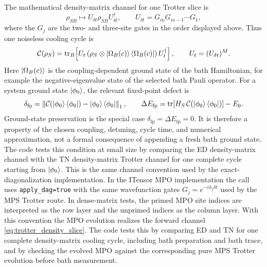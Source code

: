 \documentclass[aps,pra,twocolumn,superscriptaddress,nolongbibliography,nobalancelastpage,10pt]{revtex4-2}
\begin{document}
The mathematical density-matrix channel for one Trotter slice is
\begin{equation}
	\rho_{SB}\longmapsto U_{\delta t}\rho_{SB}U_{\delta t}^\dagger,
	\qquad
	U_{\delta t}=G_mG_{m-1}\cdots G_1,
	\label{eq:trotter_density_slice}
\end{equation}
where the $G_j$ are the two- and three-site gates in the order displayed
above.  Thus one noiseless cooling cycle is
\begin{equation}
	\mathcal C(\rho_S)=
	\operatorname{tr}_B\!\left[
	U_t\left(\rho_S\otimes\ket{\Omega_B(c)}\bra{\Omega_B(c)}\right)U_t^\dagger
	\right],
	\qquad U_t=(U_{\delta t})^M .
	\label{eq:tn_density_cycle}
\end{equation}
Here \(\ket{\Omega_B(c)}\) is the coupling-dependent ground state of the bath
Hamiltonian, for example the negative-eigenvalue state of the selected bath
Pauli operator.
For a system ground state \(\ket{\phi_0}\), the relevant fixed-point defect is
\begin{equation}
	\delta_{\mathrm{fp}}
	=
	\left\|
	\mathcal C\!\left(\ket{\phi_0}\bra{\phi_0}\right)
	-\ket{\phi_0}\bra{\phi_0}
	\right\|_1,
	\qquad
	\Delta E_{\mathrm{fp}}
	=
	\operatorname{tr}\!\left[
	H_S\,
	\mathcal C\!\left(\ket{\phi_0}\bra{\phi_0}\right)
	\right]-E_0 .
	\label{eq:ground_state_fixed_point_defect}
\end{equation}
Ground-state preservation is the special case
\(\delta_{\mathrm{fp}}=\Delta E_{\mathrm{fp}}=0\).  It is therefore a property
of the chosen coupling, detuning, cycle time, and numerical approximation, not
a formal consequence of appending a fresh bath ground state.  The code tests
this condition at small size by comparing the ED density-matrix channel with
the TN density-matrix Trotter channel for one complete cycle starting from
\(\ket{\phi_0}\).
This is the same channel convention used by the exact-diagonalization
implementation.  In the ITensor MPO implementation the call uses
\texttt{apply\_dag=true} with the same wavefunction gates
$G_j=e^{-ih_j\delta t}$ used by the MPS Trotter route.  In dense-matrix tests,
the primed MPO site indices are interpreted as the row layer and the unprimed
indices as the column layer.  With this convention the MPO evolution realizes
the forward channel \eqref{eq:trotter_density_slice}.  The code tests this by
comparing ED and TN for one complete density-matrix cooling cycle, including
bath preparation and bath trace, and by checking the evolved MPO against the
corresponding pure MPS Trotter evolution before bath measurement.
\end{document}
